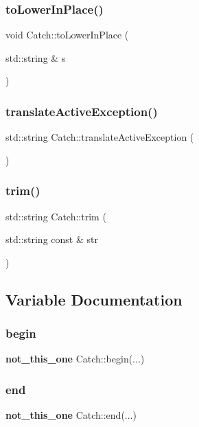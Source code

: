 \mbox{\label{namespace_catch_a0760dbe87d090a55a35414db57d272c4}} 
\subsubsection{toLowerInPlace()}
{\footnotesize\ttfamily void Catch\+::to\+Lower\+In\+Place (\begin{DoxyParamCaption}\item[{std\+::string \&}]{s }\end{DoxyParamCaption})}

\mbox{\label{namespace_catch_adafff91485eeeeb9e9333f317cc0e3b1}} 
\subsubsection{translateActiveException()}
{\footnotesize\ttfamily std\+::string Catch\+::translate\+Active\+Exception (\begin{DoxyParamCaption}{ }\end{DoxyParamCaption})}

\mbox{\label{namespace_catch_a084108b47f37d8bfd5db51c50c7451b3}} 
\subsubsection{trim()}
{\footnotesize\ttfamily std\+::string Catch\+::trim (\begin{DoxyParamCaption}\item[{std\+::string const \&}]{str }\end{DoxyParamCaption})}



\subsection{Variable Documentation}
\mbox{\label{namespace_catch_ac7ccff5c186bffa3b448b218ecf15956}} 
\subsubsection{begin}
{\footnotesize\ttfamily \textbf{ not\+\_\+this\+\_\+one} Catch\+::begin(...)}

\mbox{\label{namespace_catch_a71fef6a57614eb2d9751f8586ff6de6a}} 
\subsubsection{end}
{\footnotesize\ttfamily \textbf{ not\+\_\+this\+\_\+one} Catch\+::end(...)}

